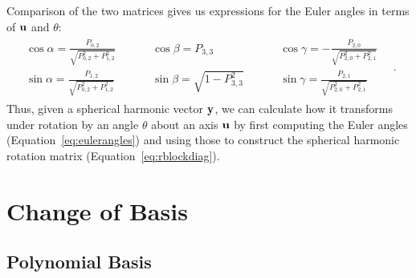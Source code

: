 \documentclass[modern]{aastex61}
\begin{document}
Comparison of the two matrices gives us expressions for the Euler
angles in terms of ${\mathbf{u}}$ and $\theta$:
%
\begin{align}
    \label{eq:eulerangles}
    \begin{matrix}
        \cos\alpha = \frac{P_{0,2}}{\sqrt{P_{0,2}^2 + P_{1,2}^2}}
        & & & &
        \cos\beta = P_{3,3}
        & & & &
        \cos\gamma = -\frac{P_{2,0}}{\sqrt{P_{2,0}^2 + P_{2,1}^2}}
        \\
        \sin\alpha = \frac{P_{1,2}}{\sqrt{P_{0,2}^2 + P_{1,2}^2}}
        & & & &
        \sin\beta = \sqrt{1 - P_{3,3}^2}
        & & & &
        \sin\gamma = \frac{P_{2,1}}{\sqrt{P_{2,0}^2 + P_{2,1}^2}}
    \end{matrix}
    \quad.
\end{align}
%
Thus, given a spherical harmonic vector ${\mathbf{y}}$, we can calculate
how it transforms under rotation by an angle $\theta$ about an axis ${\mathbf{u}}$
by first computing the Euler angles (Equation~\ref{eq:eulerangles}) and using
those to construct the spherical harmonic rotation matrix
(Equation~\ref{eq:rblockdiag}).

\pagebreak
\section{Change of Basis}
\label{sec:basis}

\subsection{Polynomial Basis}
\label{sec:polybasis}
\end{document}
